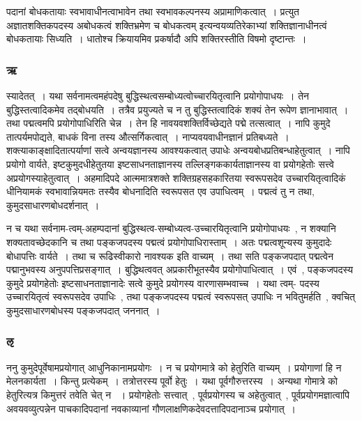 				पदानां बोधकतायाः स्वभावाधीनत्वाभावेन तथा स्वभावकल्पनस्य अप्रामाणिकत्वात्~। प्रत्युत अज्ञातशक्तिकपदस्य अबोधकत्वं शक्तिभ्रमेण च बोधकत्वम् इत्यन्वयव्यतिरेकाभ्यां  शक्तिज्ञानाधीनत्वं बोधकतायाः सिध्यति~। धातोश्च क्रियायमिव प्रकर्षादौ अपि शक्तिरस्तीति विषमो दृष्टान्तः~।

			\subsubsection{ऋ}

				\begin{small}

					स्यादेतत्~। यथा सर्वनामत्वमहंपदेषु बुद्धिस्थत्वसम्बोध्यत्वोच्चारयितृत्वानि प्रयोगोपाधयः~। तेन बुद्धिस्तत्वादिकमेव तद्बोधयति~। तत्रैव प्रयुज्यते च न तु बुद्धिस्तत्वादिकं शक्यं तेन रूपेण ज्ञानाभावात्~। तथा पद्मत्वमपि प्रयोगोपाधिरिति चेन्न~। तेन हि नावयवशक्तिर्विच्छेद्यते पद्मे तत्सत्वात्~। नापि कुमुदे तात्पर्यमपोद्यते, बाधकं विना तस्य औत्सर्गिकत्वात्~। नाप्यवयवाधीनज्ञानं प्रतिबध्यते~। शक्त्याकाङ्क्षादितात्पर्याणां सत्वे अन्वयज्ञानस्य आवश्यकत्वात् उपाधेः अन्वयबोधप्रतिबन्धाहेतुत्वात्~। नापि प्रयोगो वार्यते, इष्टकुमुदधीहेतुतया इष्टसाधनताज्ञानस्य तल्लिङ्गककार्यताज्ञानस्य वा प्रयोगहेतोः सत्त्वे अप्रयोगस्याहेतुत्वात्~। अहमादिपदे आत्ममात्रशक्ते शक्तिग्रहसहकारितया स्वरूपसदेव उच्चारयितृत्वादिकं धीनियामकं स्वभावान्नियमतः तस्यैव बोधनादिति स्वरूपसत एव उपाधित्वम्~। पद्मत्वं तु न तथा, कुमुदसाधारणबोधदर्शनात्~। 
				\end{small}

				न च यथा सर्वनाम-त्वम्-अहम्पदानां बुद्धिस्थत्व-सम्बोध्यत्व-उच्चारयितृत्वानि प्रयोगोपाधयः~, न शक्यानि शक्यतावच्छेदकानि च तथा पङ्कजपदस्य पद्मत्वं प्रयोगोपाधिरास्ताम्~। अतः पद्मत्वशून्यस्य कुमुदादेः बोधापत्तिः वार्यते~। तथा च रूढिस्वीकारो नावश्यक इति वाच्यम्~। तथा सति पङ्कजपदात् पद्मत्वेन पद्मानुभवस्य अनुपपत्तिप्रसङ्गात्~। बुद्धिथत्ववत् अप्रकारीभूतस्यैव प्रयोगोपाधित्वात्~। एवं~, पङ्कजपदस्य कुमुदे प्रयोगहेतोः इष्टसाधनताज्ञानादेः सत्वे कुमुदे प्रयोगस्य वारणासम्भवाच्च~। यथा त्वम्- पदस्य उच्चारयितृत्वं स्वरूपसदेव उपाधिः~, तथा पङ्कजपदस्य पद्मत्वं स्वरूपसत् उपाधिः न भवितुमर्हति~, क्वचित् कुमुदसाधारणबोधस्य पङ्कजपदात् जननात्~। 

			\subsubsection{ऌ}

				\begin{small}

					ननु कुमुदेपूर्वेषामप्रयोगात् आधुनिकानामप्रयोगः~। न च प्रयोगमात्रे को हेतुरिति वाच्यम्~। प्रयोगाणां हि न मेलनकार्यता~। किन्तु प्रत्येकम्~। तत्रोत्तरस्य पूर्वो हेतुः~। यथा पूर्वगौरुत्तरस्य~। अन्यथा गोमात्रे को हेतुरित्यत्र किमुत्तरं तवेति चेत् न ~। प्रयोगहेतोः सत्त्वात्~, पूर्वप्रयोगस्य च अहेतुत्वात्~, पूर्वप्रयोगमज्ञात्वापि अवयवव्युत्पन्नेन पाचकादिपदानां नवकाव्यानां गौणलाक्षणिकदेवदत्तादिपदानाञ्च प्रयोगात्~। 
				\end{small}
			
